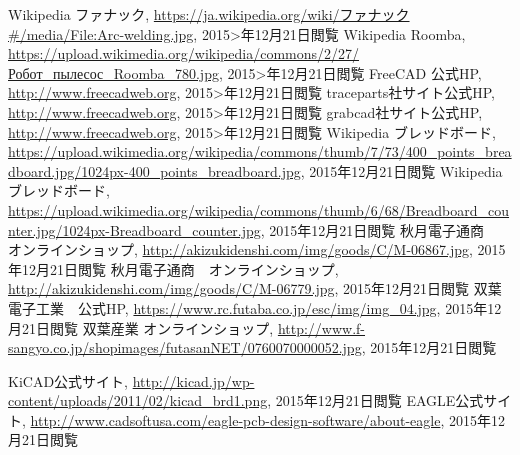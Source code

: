 \begin{thebibliography}{99}
Wikipedia ファナック, \url{https://ja.wikipedia.org/wiki/ファナック#/media/File:Arc-welding.jpg}, 2015>年12月21日閲覧
Wikipedia Roomba, \url{https://upload.wikimedia.org/wikipedia/commons/2/27/Робот_пылесос_Roomba_780.jpg}, 2015>年12月21日閲覧
FreeCAD 公式HP, \url{http://www.freecadweb.org}, 2015>年12月21日閲覧
traceparts社サイト公式HP, \url{http://www.freecadweb.org}, 2015>年12月21日閲覧
grabcad社サイト公式HP, \url{http://www.freecadweb.org}, 2015>年12月21日閲覧
Wikipedia ブレッドボード, \url{https://upload.wikimedia.org/wikipedia/commons/thumb/7/73/400_points_breadboard.jpg/1024px-400_points_breadboard.jpg}, 2015年12月21日閲覧
Wikipedia ブレッドボード, \url{https://upload.wikimedia.org/wikipedia/commons/thumb/6/68/Breadboard_counter.jpg/1024px-Breadboard_counter.jpg}, 2015年12月21日閲覧
秋月電子通商　オンラインショップ, \url{http://akizukidenshi.com/img/goods/C/M-06867.jpg}, 2015年12月21日閲覧
秋月電子通商　オンラインショップ, \url{http://akizukidenshi.com/img/goods/C/M-06779.jpg}, 2015年12月21日閲覧
双葉電子工業　公式HP, \url{https://www.rc.futaba.co.jp/esc/img/img_04.jpg}, 2015年12月21日閲覧
双葉産業 オンラインショップ, \url{http://www.f-sangyo.co.jp/shopimages/futasanNET/0760070000052.jpg}, 2015年12月21日閲覧

KiCAD公式サイト, \url{http://kicad.jp/wp-content/uploads/2011/02/kicad_brd1.png}, 2015年12月21日閲覧
EAGLE公式サイト, \url{http://www.cadsoftusa.com/eagle-pcb-design-software/about-eagle}, 2015年12月21日閲覧


\end{thebibliography}

